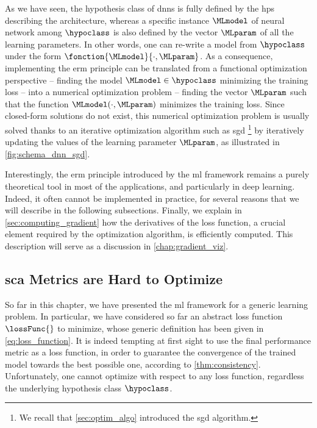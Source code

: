 As we have seen, the hypothesis class of \glspl{dnn} is fully defined by the \glspl{hp} describing the architecture, whereas a specific instance \(\MLmodel\) of neural network among \(\hypoclass\) is also defined by the vector \(\MLparam\) of all the learning parameters.
In other words, one can re-write a model from \(\hypoclass\) under the form \(\fonction{\MLmodel}{\cdot, \MLparam}\).
As a consequence, implementing the \gls{erm} principle can be translated from a functional optimization perspective -- \ie{} finding the model \(\MLmodel \in \hypoclass\) minimizing the training loss -- into a numerical optimization problem -- \ie{} finding the vector \(\MLparam\) such that the function \(\MLmodel(\cdot, \MLparam)\) minimizes the training loss.
Since closed-form solutions do not exist, this numerical optimization problem is usually solved thanks to an iterative optimization algorithm such as \gls{sgd}%
\footnote{
	We recall that \autoref{sec:optim_algo} introduced the \gls{sgd} algorithm.
} 
by iteratively updating the values of the learning parameter \(\MLparam\), as illustrated in \autoref{fig:schema_dnn_sgd}.


Interestingly, the \gls{erm} principle introduced by the \gls{ml} framework remains a purely theoretical tool in most of the applications, and particularly in deep learning.
Indeed, it often cannot be implemented in practice, for several reasons that we will describe in the following subsections.
Finally, we explain in \autoref{sec:computing_gradient} how the derivatives of the loss function, a crucial element required by the optimization algorithm, is efficiently computed.
This description will serve as a discussion in \autoref{chap:gradient_viz}.


\subsection{\gls{sca} Metrics are Hard to Optimize}
\label{sec:erm_hard}
So far in this chapter, we have presented the \gls{ml} framework for a generic learning problem.
In particular, we have considered so far an abstract loss function \(\lossFunc{}\) to minimize, whose generic definition has been given in \autoref{eq:loss_function}.
It is indeed tempting at first sight to use the final performance metric as a loss function, in order to guarantee the convergence of the trained model towards the best possible one, according to \autoref{thm:consistency}.
Unfortunately, one cannot optimize with respect to any loss function, regardless the underlying hypothesis class \(\hypoclass\).

